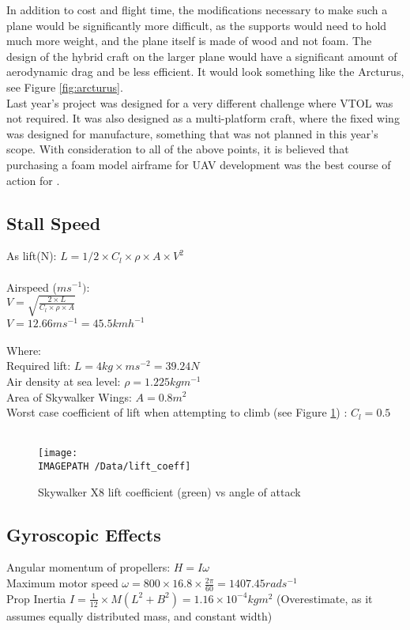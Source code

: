 In addition to cost and flight time, the modifications necessary to make such a plane would be significantly more difficult, as the supports would need to hold much more weight, and the plane itself is made of wood and not foam. The design of the hybrid craft on the larger plane would have a significant amount of aerodynamic drag and be less efficient. It would look something like the Arcturus, see Figure \ref{fig:arcturus}.\\
	
Last year's project was designed for a very different challenge where VTOL was not required. It was also designed as a multi-platform craft, where the fixed wing was designed for manufacture, something that was not planned in this year's scope. With consideration to all of the above points, it is believed that purchasing a foam model airframe for UAV development was the best course of action for \ID.

\subsection{Stall Speed}
\label{sec:stall}
As lift(N): $L = 1/2\times C_l\times\rho\times A\times V^2$\\\\
Airspeed ($ms^{-1})$:\\
$V= \sqrt{\frac{2\times L}{C_l\times \rho \times A}}$\\
$V = 12.66ms^{-1} = 45.5kmh^{-1}$\\\\
Where:\\
Required lift: $L = 4kg \times ms^{-2} = 39.24N$\\
Air density at sea level: $\rho = 1.225 kgm^{-1}$\\
Area of Skywalker Wings: $A = 0.8m^2$\\
Worst case coefficient of lift when attempting to climb (see Figure \ref{fig:lift})  
: $C_l = 0.5$
\\\\
\begin{figure}[!h]
	\centering
	\texttt{[image: \\IMAGEPATH /Data/lift\_coeff]}
	\caption{Skywalker X8 lift coefficient (green) vs angle of attack}
	\label{fig:lift}
\end{figure}


\subsection{Gyroscopic Effects}
\label{sec:gyro}
Angular momentum of propellers: $H = I\omega$\\
Maximum motor speed $\omega = 800\times16.8\times\frac{2\pi}{60} = 1407.45rads^{-1}$\\
Prop Inertia $I = \frac{1}{12}\times M(L^2+B^2) = 1.16\times10^{-4}kgm^2$ (Overestimate, as it assumes equally distributed mass, and constant width)\\\\

